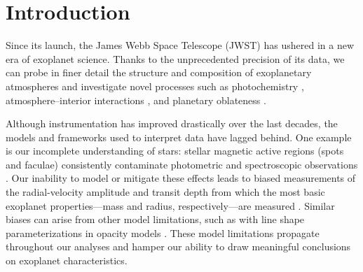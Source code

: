 \documentclass[twocolumn]{aastex631}
\begin{document}

\section{Introduction}
\label{sec:intro}
Since its launch, the James Webb Space Telescope (JWST) has ushered in a new era of exoplanet science. Thanks to the unprecedented precision of its data, we can probe in finer detail the structure and composition of exoplanetary atmospheres \citep[e.g.,][]{Xue2024, Welbanks2024} and investigate novel processes such as photochemistry \citep[e.g.,][]{Tsai2023, Dyrek2024}, atmosphere--interior interactions \citep[e.g.,][]{Tsai2021, Benneke2024}, and planetary oblateness \citep[\textit{i.e.}, internal processes; e.g.,][]{Berardo2022, Liu2025}.

Although instrumentation has improved drastically over the last decades, the models and frameworks used to interpret data have lagged behind. One example is our incomplete understanding of stars: stellar magnetic active regions (spots and faculae) consistently contaminate photometric and spectroscopic observations \citep[e.g.,][]{Dumusque2011a, Dumusque2011b, Meunier2017, Rackham2017, Rackham2018, Rackham2019, Rackham2023, Saba2025}. Our inability to model or mitigate these effects leads to biased measurements of the radial-velocity amplitude and transit depth from which the most basic exoplanet properties---mass and radius, respectively---are measured \citep[e.g.,][]{Rabus2009, Carter2011, Bonfils2013}. Similar biases can arise from other model limitations, such as with line shape parameterizations in opacity models \citep{Niraula2022, Niraula2023}. These model limitations propagate throughout our analyses and hamper our ability to draw meaningful conclusions on exoplanet characteristics. 
\end{document}
